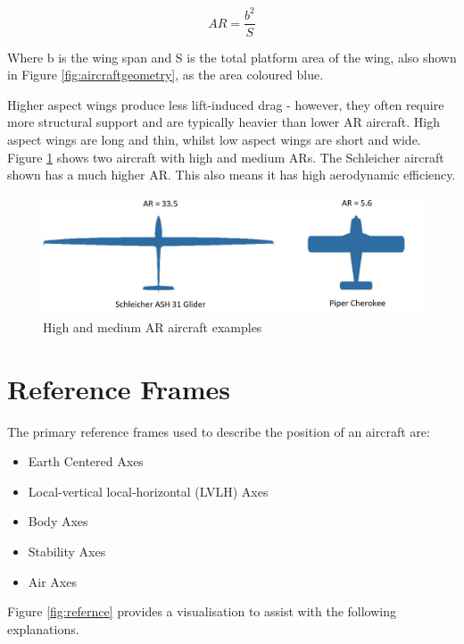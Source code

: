 \begin{equation}
    AR = \frac{b^2}{S}
    \label{eqn:Aspect}
\end{equation}

 Where \acrshort{b} is the wing span and \acrshort{S} is the total platform area of the wing, also shown in Figure \ref{fig:aircraftgeometry}, as the area coloured blue. 

Higher aspect wings produce less lift-induced drag - however, they often require more structural support and are typically heavier than lower \acrshort{AR} aircraft. High aspect wings are long and thin, whilst low aspect wings are short and wide. Figure \ref{fig:AR} shows two aircraft with high and medium \acrshort{AR}s. The Schleicher aircraft shown has a much higher \acrshort{AR}. This also means it has high aerodynamic efficiency. 



\begin{figure}[H]
  \centering
  \includegraphics[width=1\linewidth]{03_LiteratureReview/Figs/AspectRatio.JPG}
  \caption{High and medium \acrshort{AR} aircraft examples \cite{gliderImages}}
  \label{fig:AR}
\end{figure}

\section{Reference Frames}
The primary reference frames used to describe the position of an aircraft are:
\begin{itemize}
    \item Earth Centered Axes
    \item Local-vertical local-horizontal (\acrshort{LVLH}) Axes
    \item Body Axes
    \item Stability Axes
    \item Air Axes
\end{itemize}
Figure \ref{fig:refernce} provides a visualisation to assist with the following explanations.

